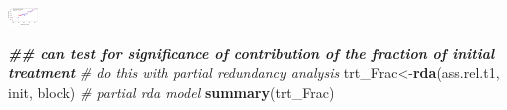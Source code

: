 \documentclass[
]{article}
\newenvironment{Shaded}{\begin{snugshade}}{\end{snugshade}}
\newcommand{\CommentTok}[1]{\textcolor[rgb]{0.56,0.35,0.01}{\textit{#1}}}
\newcommand{\DocumentationTok}[1]{\textcolor[rgb]{0.56,0.35,0.01}{\textbf{\textit{#1}}}}
\newcommand{\FunctionTok}[1]{\textcolor[rgb]{0.13,0.29,0.53}{\textbf{#1}}}
\newcommand{\NormalTok}[1]{#1}
\newcommand{\OtherTok}[1]{\textcolor[rgb]{0.56,0.35,0.01}{#1}}
\begin{document}
\includegraphics[width=30]{log-project-aubrie-winnie_files/figure-latex/unnamed-chunk-5-1}

\begin{Shaded}
\begin{Highlighting}[]
\DocumentationTok{\#\# can test for significance of contribution of the fraction of initial treatment}
\CommentTok{\# do this with partial redundancy analysis}
\NormalTok{trt\_Frac}\OtherTok{\textless{}{-}}\FunctionTok{rda}\NormalTok{(ass.rel.t1, init, block) }\CommentTok{\# partial rda model}
\FunctionTok{summary}\NormalTok{(trt\_Frac) }
\end{Highlighting}
\end{Shaded}
\end{document}
